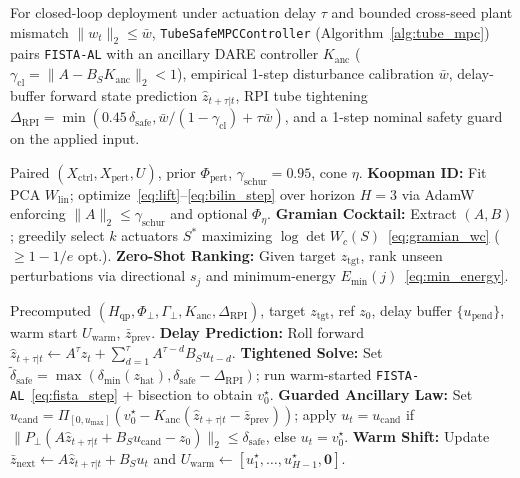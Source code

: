 \documentclass[journal]{IEEEtran}
\begin{document}
For closed-loop deployment under actuation delay $\tau$ and bounded cross-seed plant mismatch $\|w_t\|_2 \le \bar{w}$, \texttt{TubeSafeMPCController} (Algorithm~\ref{alg:tube_mpc}) pairs \texttt{FISTA-AL} with an ancillary DARE controller $K_{\mathrm{anc}}$ ($\gamma_{\mathrm{cl}} = \|A - B_S K_{\mathrm{anc}}\|_2 < 1$), empirical 1-step disturbance calibration $\bar{w}$, delay-buffer forward state prediction $\hat{z}_{t+\tau|t}$, RPI tube tightening $\Delta_{\mathrm{RPI}} = \min(0.45\,\delta_{\mathrm{safe}}, \bar{w}/(1-\gamma_{\mathrm{cl}}) + \tau\bar{w})$, and a 1-step nominal safety guard on the applied input.

\begin{algorithm}[t]
\caption{KGC-MPC: Contractive Koopman ID and Gramian Design}
\label{alg:kgc_mpc}
\small
\begin{algorithmic}[1]
\REQUIRE Paired $(X_{\mathrm{ctrl}}, X_{\mathrm{pert}}, U)$, prior $\Phi_{\mathrm{pert}}$, $\gamma_{\mathrm{schur}}=0.95$, cone $\eta$.
\STATE \textbf{Koopman ID:} Fit PCA $W_{\mathrm{lin}}$; optimize~\eqref{eq:lift}--\eqref{eq:bilin_step} over horizon $H=3$ via AdamW enforcing $\|A\|_2 \le \gamma_{\mathrm{schur}}$ and optional $\Phi_\eta$.
\STATE \textbf{Gramian Cocktail:} Extract $(A, B)$; greedily select $k$ actuators $S^*$ maximizing $\log\det W_c(S)$~\eqref{eq:gramian_wc} ($\ge 1-1/e$ opt.).
\STATE \textbf{Zero-Shot Ranking:} Given target $z_{\mathrm{tgt}}$, rank unseen perturbations via directional $s_j$ and minimum-energy $E_{\min}(j)$~\eqref{eq:min_energy}.
\end{algorithmic}
\end{algorithm}

\begin{algorithm}[t]
\caption{Online Delay-Compensated RPI Tube-MPC (\texttt{FISTA-AL})}
\label{alg:tube_mpc}
\small
\begin{algorithmic}[1]
\REQUIRE Precomputed $(H_{\mathrm{qp}}, \Phi_\perp, \Gamma_\perp, K_{\mathrm{anc}}, \Delta_{\mathrm{RPI}})$, target $z_{\mathrm{tgt}}$, ref $z_0$, delay buffer $\{u_{\mathrm{pend}}\}$, warm start $U_{\mathrm{warm}}$, $\bar{z}_{\mathrm{prev}}$.
\STATE \textbf{Delay Prediction:} Roll forward $\hat{z}_{t+\tau|t} \leftarrow A^\tau z_t + \sum_{d=1}^{\tau} A^{\tau-d} B_S u_{t-d}$.
\STATE \textbf{Tightened Solve:} Set $\tilde{\delta}_{\mathrm{safe}} = \max(\delta_{\min}(z_{\mathrm{hat}}), \delta_{\mathrm{safe}} - \Delta_{\mathrm{RPI}})$; run warm-started \texttt{FISTA-AL}~\eqref{eq:fista_step} + bisection to obtain $v_0^\star$.
\STATE \textbf{Guarded Ancillary Law:} Set $u_{\mathrm{cand}} = \Pi_{[0,u_{\max}]}(v_0^\star - K_{\mathrm{anc}}(\hat{z}_{t+\tau|t} - \bar{z}_{\mathrm{prev}}))$; apply $u_t = u_{\mathrm{cand}}$ if $\|P_\perp(A\hat{z}_{t+\tau|t}+B_S u_{\mathrm{cand}}-z_0)\|_2 \le \delta_{\mathrm{safe}}$, else $u_t = v_0^\star$.
\STATE \textbf{Warm Shift:} Update $\bar{z}_{\mathrm{next}} \leftarrow A\hat{z}_{t+\tau|t} + B_S u_t$ and $U_{\mathrm{warm}} \leftarrow [u_1^\star,\dots,u_{H-1}^\star,\mathbf{0}]$.
\end{algorithmic}
\end{algorithm}
\end{document}
